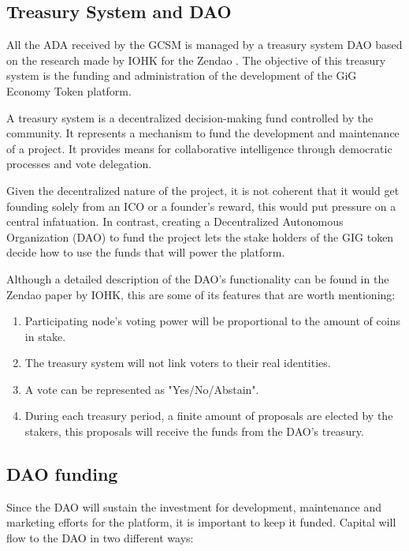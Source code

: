 \documentclass{article}
\begin{document}
\subsection{Treasury System and DAO}

All the ADA received by the GCSM is managed by a treasury system DAO based on the research made by IOHK for the Zendao \cite{zhangb2}. The objective of this treasury system is the funding and administration of the development of the GiG Economy Token platform.

A treasury system is a decentralized decision-making fund controlled by the community. It represents a mechanism to fund the development and maintenance of a project. It provides means for collaborative intelligence through democratic processes and vote delegation. 

Given the decentralized nature of the project, it is not coherent that it would get founding solely from an ICO or a founder's reward, this would put pressure on a central infatuation. In contrast, creating a Decentralized Autonomous Organization (DAO) to fund the project lets the stake holders of the GIG token decide how to use the funds that will power the platform. 

Although a detailed description of the DAO's functionality can be found in the Zendao paper by IOHK, this are some of its features that are worth mentioning:

\begin{enumerate}

  \item Participating node's voting power will be proportional to the amount of coins in stake. 
  \item The treasury system will not link voters to their real identities.
  \item A vote can be represented as "Yes/No/Abstain".
  \item During each treasury period, a finite amount of proposals are elected by the stakers, this proposals will receive the funds from the DAO's treasury.
   
\end{enumerate}


\subsection{DAO funding}

Since the DAO will sustain the investment for development, maintenance and marketing efforts for the platform, it is important to keep it funded. Capital will flow to the DAO in two different ways:
\end{document}
